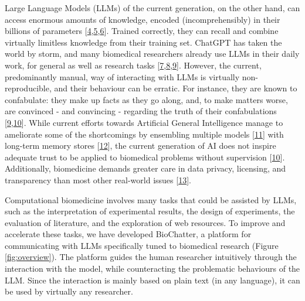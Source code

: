 Large Language Models (LLMs) of the current generation, on the other hand, can access enormous amounts of knowledge, encoded (incomprehensibly) in their billions of parameters {[}\protect\hyperlink{ref-JIjeWPOb}{4},\protect\hyperlink{ref-IzWFZmuQ}{5},\protect\hyperlink{ref-17lpGtuH5}{6}{]}.
Trained correctly, they can recall and combine virtually limitless knowledge from their training set.
ChatGPT has taken the world by storm, and many biomedical researchers already use LLMs in their daily work, for general as well as research tasks {[}\protect\hyperlink{ref-viLUfCLq}{7},\protect\hyperlink{ref-ae7XiPvs}{8},\protect\hyperlink{ref-wo7jyZHW}{9}{]}.
However, the current, predominantly manual, way of interacting with LLMs is virtually non-reproducible, and their behaviour can be erratic.
For instance, they are known to confabulate: they make up facts as they go along, and, to make matters worse, are convinced - and convincing - regarding the truth of their confabulations {[}\protect\hyperlink{ref-wo7jyZHW}{9},\protect\hyperlink{ref-elx4isXx}{10}{]}.
While current efforts towards Artificial General Intelligence manage to ameliorate some of the shortcomings by ensembling multiple models {[}\protect\hyperlink{ref-UEmjXz02}{11}{]} with long-term memory stores {[}\protect\hyperlink{ref-gy4YOpGJ}{12}{]}, the current generation of AI does not inspire adequate trust to be applied to biomedical problems without supervision {[}\protect\hyperlink{ref-elx4isXx}{10}{]}.
Additionally, biomedicine demands greater care in data privacy, licensing, and transparency than most other real-world issues {[}\protect\hyperlink{ref-fliCQWwF}{13}{]}.

Computational biomedicine involves many tasks that could be assisted by LLMs, such as the interpretation of experimental results, the design of experiments, the evaluation of literature, and the exploration of web resources.
To improve and accelerate these tasks, we have developed BioChatter, a platform for communicating with LLMs specifically tuned to biomedical research (Figure \ref{fig:overview}).
The platform guides the human researcher intuitively through the interaction with the model, while counteracting the problematic behaviours of the LLM.
Since the interaction is mainly based on plain text (in any language), it can be used by virtually any researcher.

